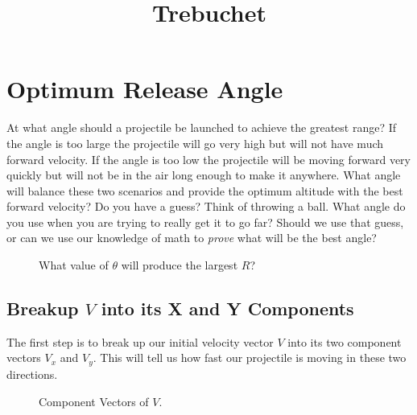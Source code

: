 \documentclass[10pt,a4paper]{article}
\begin{document}
\title{Trebuchet}
	\section{Optimum Release Angle}
		At what angle should a projectile be launched to achieve the greatest range?
		If the angle is too large the projectile will go very high but will not have much forward velocity.
		If the angle is too low the projectile will be moving forward very quickly but will not be in the air long enough to make it anywhere.
		What angle will balance these two scenarios and provide the optimum altitude with the best forward velocity?
		Do you have a guess? Think of throwing a ball. What angle do you use when you are trying to really get it to go far?
		Should we use that guess, or can we use our knowledge of math to \emph{prove} what will be the best angle?
		
		\begin{figure}
		\caption{What value of $\theta$ will produce the largest $R$?}
		\label{fig:launchAngle}
		\end{figure}
		
	\subsection{Breakup $V$ into its  X and Y Components}
		The first step is to break up our initial velocity vector $V$ into its two component vectors $V_x$ and $V_y$.
		This will tell us how fast our projectile is moving in these two directions.
		
		\begin{wrapfigure}{l}{0.45\textwidth}
		\caption{Component Vectors of $V$.}
		\label{fig:componentVectors}
		\end{wrapfigure}
		
\end{document}
